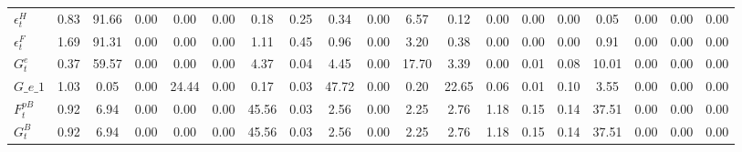 \begin{center}
\begin{longtable}{lcccccccccccccccccc}
$ \epsilon^H_t      $	 & 	             0.83	 & 	            91.66	 & 	             0.00	 & 	             0.00	 & 	             0.00	 & 	             0.18	 & 	             0.25	 & 	             0.34	 & 	             0.00	 & 	             6.57	 & 	             0.12	 & 	             0.00	 & 	             0.00	 & 	             0.00	 & 	             0.05	 & 	             0.00	 & 	             0.00	 & 	             0.00 \\ 
$ \epsilon^F_t      $	 & 	             1.69	 & 	            91.31	 & 	             0.00	 & 	             0.00	 & 	             0.00	 & 	             1.11	 & 	             0.45	 & 	             0.96	 & 	             0.00	 & 	             3.20	 & 	             0.38	 & 	             0.00	 & 	             0.00	 & 	             0.00	 & 	             0.91	 & 	             0.00	 & 	             0.00	 & 	             0.00 \\ 
$ G^e_t             $	 & 	             0.37	 & 	            59.57	 & 	             0.00	 & 	             0.00	 & 	             0.00	 & 	             4.37	 & 	             0.04	 & 	             4.45	 & 	             0.00	 & 	            17.70	 & 	             3.39	 & 	             0.00	 & 	             0.01	 & 	             0.08	 & 	            10.01	 & 	             0.00	 & 	             0.00	 & 	             0.00 \\ 
$G\_e\_1            $	 & 	             1.03	 & 	             0.05	 & 	             0.00	 & 	            24.44	 & 	             0.00	 & 	             0.17	 & 	             0.03	 & 	            47.72	 & 	             0.00	 & 	             0.20	 & 	            22.65	 & 	             0.06	 & 	             0.01	 & 	             0.10	 & 	             3.55	 & 	             0.00	 & 	             0.00	 & 	             0.00 \\ 
$ F^{pB}_t          $	 & 	             0.92	 & 	             6.94	 & 	             0.00	 & 	             0.00	 & 	             0.00	 & 	            45.56	 & 	             0.03	 & 	             2.56	 & 	             0.00	 & 	             2.25	 & 	             2.76	 & 	             1.18	 & 	             0.15	 & 	             0.14	 & 	            37.51	 & 	             0.00	 & 	             0.00	 & 	             0.00 \\ 
$ G^B_t             $	 & 	             0.92	 & 	             6.94	 & 	             0.00	 & 	             0.00	 & 	             0.00	 & 	            45.56	 & 	             0.03	 & 	             2.56	 & 	             0.00	 & 	             2.25	 & 	             2.76	 & 	             1.18	 & 	             0.15	 & 	             0.14	 & 	            37.51	 & 	             0.00	 & 	             0.00	 & 	             0.00 \\ 

\end{longtable}
\end{center}
